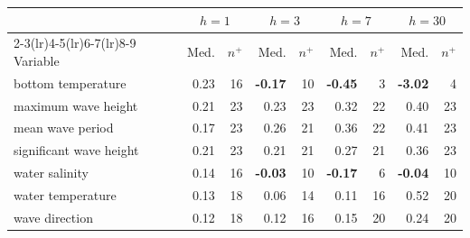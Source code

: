 \begin{tabular}{l rr rr rr rr}
\toprule
 & \multicolumn{2}{c}{$h=1$} & \multicolumn{2}{c}{$h=3$} & \multicolumn{2}{c}{$h=7$} & \multicolumn{2}{c}{$h=30$} \\
\cmidrule(lr){2-3}\cmidrule(lr){4-5}\cmidrule(lr){6-7}\cmidrule(lr){8-9}
Variable & Med. & $n^{+}$ & Med. & $n^{+}$ & Med. & $n^{+}$ & Med. & $n^{+}$ \\
\midrule
bottom temperature & 0.23 & 16 & \textbf{-0.17} & 10 & \textbf{-0.45} & 3 & \textbf{-3.02} & 4 \\
maximum wave height & 0.21 & 23 & 0.23 & 23 & 0.32 & 22 & 0.40 & 23 \\
mean wave period & 0.17 & 23 & 0.26 & 21 & 0.36 & 22 & 0.41 & 23 \\
significant wave height & 0.21 & 23 & 0.21 & 21 & 0.27 & 21 & 0.36 & 23 \\
water salinity & 0.14 & 16 & \textbf{-0.03} & 10 & \textbf{-0.17} & 6 & \textbf{-0.04} & 10 \\
water temperature & 0.13 & 18 & 0.06 & 14 & 0.11 & 16 & 0.52 & 20 \\
wave direction & 0.12 & 18 & 0.12 & 16 & 0.15 & 20 & 0.24 & 20 \\
\bottomrule
\end{tabular}